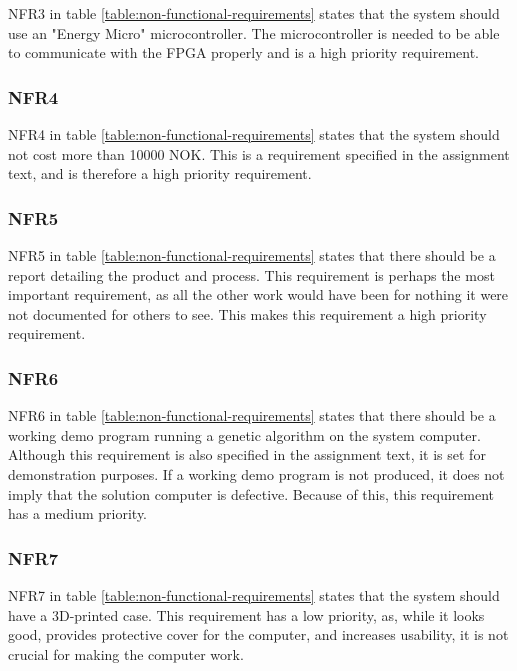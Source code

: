 NFR3 in table \vref{table:non-functional-requirements} states that the system should use an "Energy Micro" microcontroller.
The microcontroller is needed to be able to communicate with the FPGA properly and is a high priority requirement.

\subsubsection{NFR4}

NFR4 in table \vref{table:non-functional-requirements} states that the system should not cost more than 10000 NOK.
This is a requirement specified in the assignment text, and is therefore a high priority requirement.

\subsubsection{NFR5}

NFR5 in table \vref{table:non-functional-requirements} states that there should be a report detailing the product and process.
This requirement is perhaps the most important requirement, as all the other work would have been for nothing it were not documented for others to see.
This makes this requirement a high priority requirement.

\subsubsection{NFR6}

NFR6 in table \vref{table:non-functional-requirements} states that there should be a working demo program running a genetic algorithm on the system computer.
Although this requirement is also specified in the assignment text, it is set for demonstration purposes.
If a working demo program is not produced, it does not imply that the solution computer is defective.
Because of this, this requirement has a medium priority.

\subsubsection{NFR7}

NFR7 in table \vref{table:non-functional-requirements} states that the system should have a 3D-printed case.
This requirement has a low priority, as, while it looks good, provides protective cover for the computer, and increases usability, it is not crucial for making the computer work.

